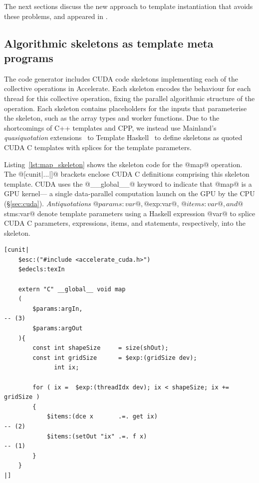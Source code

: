 The next sections discuss the new approach to template instantiation that avoids
these problems, and appeared in \cite{CliftonEverest:2014vi}.


\subsection{Algorithmic skeletons as template meta programs}

The code generator includes CUDA code skeletons implementing each of the
collective operations in Accelerate. Each skeleton encodes the behaviour for
each thread for this collective operation, fixing the parallel algorithmic
structure of the operation. Each skeleton contains placeholders for the inputs
that parameterise the skeleton, such as the array types and worker functions.
Due to the shortcomings of C++ templates and CPP, we instead use Mainland's
\emph{quasiquotation}\qq{} extensions~\cite{Mainland:2007bl} to Template
Haskell~\cite{Sheard:2002wu} to define skeletons as quoted CUDA C templates
with splices for the template parameters.

Listing~\ref{lst:map_skeleton} shows the skeleton code for the @map@
operation. The @[cunit|...|]@ brackets enclose CUDA C definitions
comprising this skeleton\skeleton{} template. CUDA uses the
@__global__@ keyword to indicate that @map@ is a GPU
kernel\cuda[kernel] --- a single data-parallel computation launch on the GPU by
the CPU (\S\ref{sec:cuda}). \emph{Antiquotations}\aq{} @$params:var@,
@$exp:var@, @$items:var@, and @$stms:var@ denote template parameters using a
Haskell expression @var@ to splice CUDA C parameters, expressions, items, and
statements, respectively, into the skeleton.

\begin{lstlisting}[style=haskell_float,
    name=map_skeleton,
    label=lst:map_skeleton,
    caption={Accelerate CUDA skeleton for the \code{map} operation}]
[cunit|
    $esc:("#include <accelerate_cuda.h>")
    $edecls:texIn

    extern "C" __global__ void map
    (
        $params:argIn,                                                                 -- (3)
        $params:argOut
    ){
        const int shapeSize     = size(shOut);
        const int gridSize      = $exp:(gridSize dev);
              int ix;

        for ( ix =  $exp:(threadIdx dev); ix < shapeSize; ix += gridSize )
        {
            $items:(dce x       .=. get ix)                                            -- (2)
            $items:(setOut "ix" .=. f x)                                               -- (1)
        }
    }
|]
\end{lstlisting}

